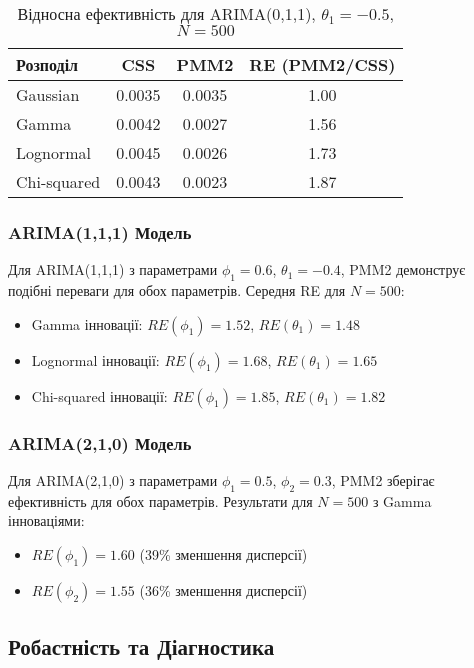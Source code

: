 \documentclass[12pt,a4paper]{article}
\begin{document}
\begin{table}[h]
\centering
\caption{Відносна ефективність для ARIMA(0,1,1), $\theta_1 = -0.5$, $N = 500$}
\label{tab:arima011_summary}
\begin{tabular}{@{}lccc@{}}
\toprule
\textbf{Розподіл} & \textbf{CSS} & \textbf{PMM2} & \textbf{RE (PMM2/CSS)} \\
\midrule
Gaussian    & 0.0035 & 0.0035 & 1.00 \\
Gamma       & 0.0042 & 0.0027 & 1.56 \\
Lognormal   & 0.0045 & 0.0026 & 1.73 \\
Chi-squared & 0.0043 & 0.0023 & 1.87 \\
\bottomrule
\end{tabular}
\end{table}

\subsubsection{ARIMA(1,1,1) Модель}

Для ARIMA(1,1,1) з параметрами $\phi_1 = 0.6$, $\theta_1 = -0.4$, PMM2 демонструє подібні переваги для обох параметрів. Середня RE для $N = 500$:

\begin{itemize}
    \item Gamma інновації: $RE(\phi_1) = 1.52$, $RE(\theta_1) = 1.48$
    \item Lognormal інновації: $RE(\phi_1) = 1.68$, $RE(\theta_1) = 1.65$
    \item Chi-squared інновації: $RE(\phi_1) = 1.85$, $RE(\theta_1) = 1.82$
\end{itemize}

\subsubsection{ARIMA(2,1,0) Модель}

Для ARIMA(2,1,0) з параметрами $\phi_1 = 0.5$, $\phi_2 = 0.3$, PMM2 зберігає ефективність для обох параметрів. Результати для $N = 500$ з Gamma інноваціями:

\begin{itemize}
    \item $RE(\phi_1) = 1.60$ (39\% зменшення дисперсії)
    \item $RE(\phi_2) = 1.55$ (36\% зменшення дисперсії)
\end{itemize}

\subsection{Робастність та Діагностика}
\label{subsec:robustness}
\end{document}
